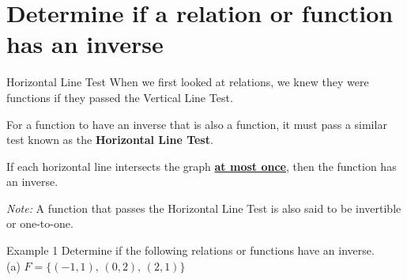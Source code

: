 \documentclass[t,usenames,dvipsnames]{beamer}
\begin{document}
\section{Determine if a relation or function has an inverse}

\begin{frame}{Horizontal Line Test}
When we first looked at relations, we knew they were functions if they passed the \alert{Vertical Line Test}. \newline\\ \pause

For a function to have an inverse that is also a function, it must pass a similar test known as the {\color{blue}\textbf{Horizontal Line Test}}.    \newline\\  \pause

\begin{tcolorbox}[colframe=green!60!black, title=Horizontal Line Test]{If each horizontal line intersects the graph \textbf{\underline{at most once}}, then the function has an inverse.} 
\end{tcolorbox}
\pause

\emph{Note:} A function that passes the Horizontal Line Test is also said to be \alert{invertible} or \alert{one-to-one}.
\end{frame}

\begin{frame}{Example 1}
Determine if the following relations or functions have an inverse.   \newline\\
(a) \quad $F = \{(-1,1), \, (0,2), \, (2,1) \}$ \newline\\  
\begin{minipage}{0.55\textwidth}
\end{minipage}
\begin{minipage}{0.4\textwidth}
\end{minipage}
\end{frame}
\end{document}

